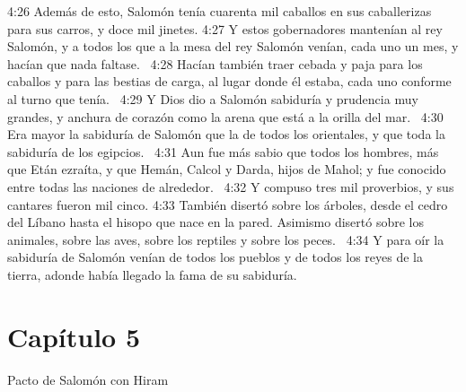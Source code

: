 4:26 Además de esto, Salomón tenía cuarenta mil caballos en sus caballerizas para sus carros, y doce mil jinetes. 
4:27 Y estos gobernadores mantenían al rey Salomón, y a todos los que a la mesa del rey Salomón venían, cada uno un mes, y hacían que nada faltase.  
4:28 Hacían también traer cebada y paja para los caballos y para las bestias de carga, al lugar donde él estaba, cada uno conforme al turno que tenía.  
4:29 Y Dios dio a Salomón sabiduría y prudencia muy grandes, y anchura de corazón como la arena que está a la orilla del mar.  
4:30 Era mayor la sabiduría de Salomón que la de todos los orientales, y que toda la sabiduría de los egipcios.  
4:31 Aun fue más sabio que todos los hombres, más que Etán ezraíta, y que Hemán, Calcol y Darda, hijos de Mahol; y fue conocido entre todas las naciones de alrededor.  
4:32 Y compuso tres mil proverbios, y sus cantares fueron mil cinco. 
4:33 También disertó sobre los árboles, desde el cedro del Líbano hasta el hisopo que nace en la pared. Asimismo disertó sobre los animales, sobre las aves, sobre los reptiles y sobre los peces.  
4:34 Y para oír la sabiduría de Salomón venían de todos los pueblos y de todos los reyes de la tierra, adonde había llegado la fama de su sabiduría.  
\section*{Capítulo 5 }
Pacto de Salomón con Hiram  


